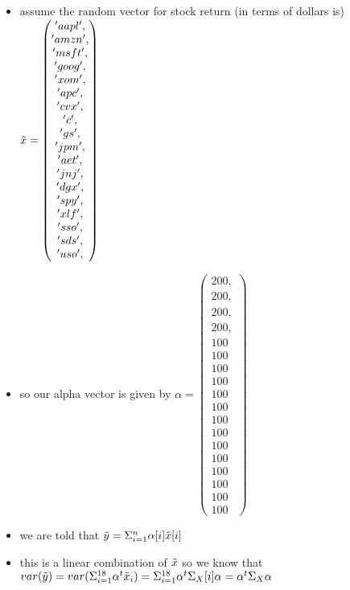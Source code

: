 \documentclass[12pt,twoside]{article}
\begin{document}
\begin{enumerate}
\begin{enumerate}
  \begin{itemize}
    \color{blue}
    \item assume the random vector for stock return (in terms of dollars is) $\Tilde{x}=\begin{pmatrix}
      'aapl',\\
      'amzn',\\
      'msft',\\
      'goog',\\
      'xom', \\
      'apc',  \\
      'cvx', \\
      'c',    \\
      'gs',  \\
      'jpm', \\
      'aet', \\
      'jnj',  \\
      'dgx',\\
      'spy',  \\
      'xlf',\\
      'sso',  \\
      'sds',  \\
      'uso', \\
    \end{pmatrix}$ 
    \item so our alpha vector is given by $\alpha=\begin{pmatrix}
      200,\\
      200,\\
      200,\\
      200,\\
      100\\100\\100\\100\\100\\100\\100\\100\\100\\100\\100\\100\\100\\100
    \end{pmatrix}$
    \item we are told that $\Tilde{y}=\Sigma_{i=1}^{n}\alpha[i]\Tilde{x}[i]$
    \item this is a linear combination of $\Tilde{x}$ so we know that $var(\Tilde{y})=var(\Sigma_{i=1}^{18}\alpha^{t}\Tilde{x}_i)=\Sigma_{i=1}^{18}\alpha^{t}\Sigma_{X}[i]\alpha=\alpha^{t}\Sigma_{X}\alpha$

\end{itemize}
\end{enumerate}
\end{enumerate}
\end{document}
